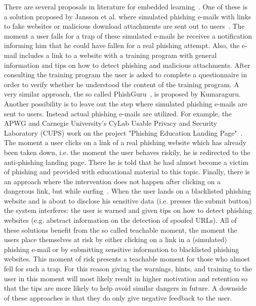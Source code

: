 There are several proposals in literature for embedded learning~\cite{jannson2011simulating, kumaraguru2009phishguru,alnajim2009antiphishing}. 
One of these is a solution proposed by Jansson et al. where simulated phishing e-mails with links to fake websites or malicious download attachments are sent out to users~\cite{jannson2011simulating}. 
The moment a user falls for a trap of these simulated e-mails he receives a notification informing him that he could have fallen for a real phishing attempt. 
Also, the e-mail includes a link to a website with a training program with general information and tips on how to detect phishing and malicious attachments. 
After consulting the training program the user is asked to complete a questionnaire in order to verify whether he understood the content of the training program. 
A very similar approach, the so called PhishGuru~\cite{kumaraguru2009phishguru}, is proposed by Kumaraguru. 
Another possibility is to leave out the step where simulated phishing e-mails are sent to users. 
Instead actual phishing e-mails are utilized. 
For example, the APWG and Carnegie University's CyLab Usable Privacy and Security Laboratory (CUPS) work on the project "Phishing Education Landing Page"~\cite{apwg2009landingpage}. 
The moment a user clicks on a link of a real phishing website which has already been taken down, i.e. the moment the user behaves riskily, he is redirected to the anti-phishing landing page.
There he is told that he had almost become a victim of phishing and provided with educational material to this topic. 
Finally, there is an approach where the intervention does not happen after clicking on a dangerous link, but while surfing~\cite{alnajim2009antiphishing}. 
When the user lands on a blacklisted phishing website and is about to disclose his sensitive data (i.e. presses the submit button) the system interferes: 
the user is warned and given tips on how to detect phishing websites (e.g. abstract information on the detection of spoofed URLs). 
All of these solutions benefit from the so called teachable moment, the moment the users place themselves at risk by either clicking on a link in a (simulated) phishing e-mail or by submitting sensitive information to blacklisted phishing websites. 
This moment of risk presents a teachable moment for those who almost fell for such a trap. 
For this reason giving the warnings, hints, and training to the user in this moment will most likely result in higher motivation and retention so that the tips are more likely to help avoid similar dangers in future. 
A downside of these approaches is that they do only give negative feedback to the user. 
